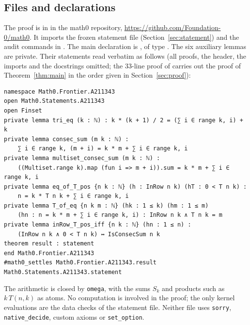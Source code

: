 \documentclass[11pt]{amsart}
\theoremstyle{plain}
\theoremstyle{definition}
\begin{document}
\subsection*{Files and declarations}
The proof is in  in the math0 repository, \url{https://github.com/Foundation-0/math0}. It imports the frozen statement file  (Section~\ref{sec:statement}) and the audit commands in . The main declaration is , of type . The six auxiliary lemmas are private. Their statements read verbatim as follows (all proofs, the header, the imports and the docstrings omitted; the $33$-line proof of  carries out the proof of Theorem~\ref{thm:main} in the order given in Section~\ref{sec:proof}):
\begin{lstlisting}
namespace Math0.Frontier.A211343
open Math0.Statements.A211343
open Finset
private lemma tri_eq (k : ℕ) : k * (k + 1) / 2 = (∑ i ∈ range k, i) + k
private lemma consec_sum (m k : ℕ) :
    ∑ i ∈ range k, (m + i) = k * m + ∑ i ∈ range k, i
private lemma multiset_consec_sum (m k : ℕ) :
    ((Multiset.range k).map (fun i => m + i)).sum = k * m + ∑ i ∈ range k, i
private lemma eq_of_T_pos {n k : ℕ} (h : InRow n k) (hT : 0 < T n k) :
    n = k * T n k + ∑ i ∈ range k, i
private lemma T_of_eq {n k m : ℕ} (hk : 1 ≤ k) (hm : 1 ≤ m)
    (hn : n = k * m + ∑ i ∈ range k, i) : InRow n k ∧ T n k = m
private lemma inRow_T_pos_iff {n k : ℕ} (hn : 1 ≤ n) :
    (InRow n k ∧ 0 < T n k) ↔ IsConsecSum n k
theorem result : statement
end Math0.Frontier.A211343
#math0_settles Math0.Frontier.A211343.result Math0.Statements.A211343.statement
\end{lstlisting}
The arithmetic is closed by \texttt{omega}, with the sums $S_k$ and products such as $k\,T(n,k)$ as atoms. No computation is involved in the proof; the only kernel evaluations are the data checks of the statement file. Neither file uses \texttt{sorry}, \texttt{native\_decide}, custom axioms or \texttt{set\_option}.
\end{document}
